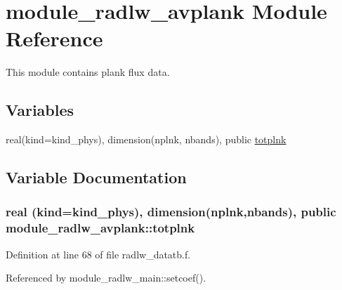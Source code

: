 \hypertarget{namespacemodule__radlw__avplank}{}\section{module\+\_\+radlw\+\_\+avplank Module Reference}
\label{namespacemodule__radlw__avplank}


This module contains plank flux data.  


\subsection*{Variables}
\begin{DoxyCompactItemize}
\item 
real(kind=kind\+\_\+phys), dimension(nplnk, nbands), public \hyperlink{namespacemodule__radlw__avplank_a40c3d6831ec6d7dbdb31254226c8f861}{totplnk}
\end{DoxyCompactItemize}


\subsection{Variable Documentation}
\subsubsection[{\texorpdfstring{totplnk}{totplnk}}]{\setlength{\rightskip}{0pt plus 5cm}real (kind=kind\+\_\+phys), dimension(nplnk,nbands), public module\+\_\+radlw\+\_\+avplank\+::totplnk}\hypertarget{namespacemodule__radlw__avplank_a40c3d6831ec6d7dbdb31254226c8f861}{}\label{namespacemodule__radlw__avplank_a40c3d6831ec6d7dbdb31254226c8f861}


Definition at line 68 of file radlw\+\_\+datatb.\+f.



Referenced by module\+\_\+radlw\+\_\+main\+::setcoef().

